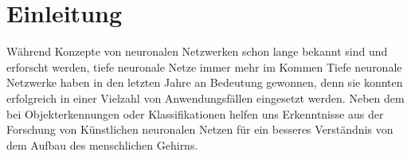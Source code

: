 \chapter{Einleitung}
Während Konzepte von neuronalen Netzwerken schon lange bekannt sind und erforscht werden,  
tiefe neuronale Netze immer mehr im Kommen 
Tiefe neuronale Netzwerke haben in den letzten Jahre an Bedeutung gewonnen, denn sie konnten erfolgreich in einer Vielzahl von Anwendungsfällen eingesetzt werden. 
Neben dem  bei Objekterkennungen oder Klassifikationen helfen uns Erkenntnisse aus der Forschung von Künstlichen neuronalen Netzen für ein besseres Verständnis von dem Aufbau des menschlichen Gehirns. 
